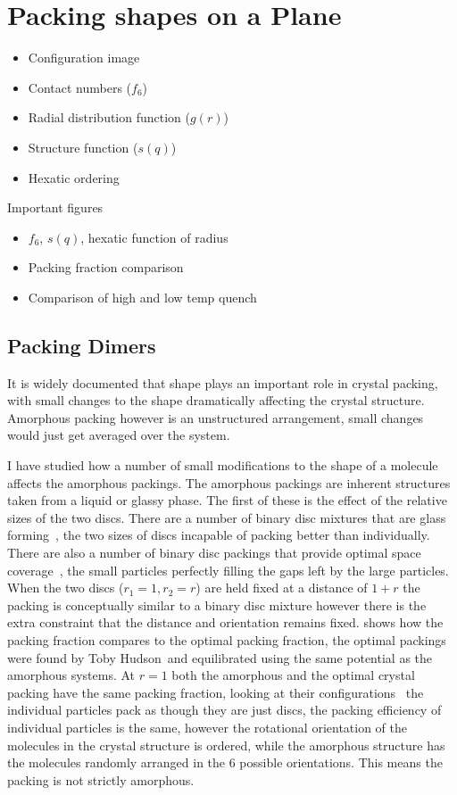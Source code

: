 \chapter{Packing shapes on a Plane}

\begin{itemize}
    \item Configuration image
    \item Contact numbers ($f_6$)
    \item Radial distribution function ($g(r)$)
    \item Structure function ($s(q)$)
    \item Hexatic ordering 
\end{itemize}

Important figures
\begin{itemize}
    \item $f_6$, $s(q)$, hexatic function of radius
    \item Packing fraction comparison
    \item Comparison of high and low temp quench
\end{itemize}

\section{Packing Dimers}

It is widely documented that shape plays an important role in crystal packing\tocite, with small changes to the shape dramatically affecting the crystal structure. Amorphous packing however is an unstructured arrangement, small changes would just get averaged over the system.

I have studied how a number of small modifications to the shape of a molecule affects the amorphous packings. The amorphous packings are inherent structures taken from a liquid or glassy phase. The first of these is the effect of the relative sizes of the two discs. There are a number of binary disc mixtures that are glass forming~\tocite, the two sizes of discs incapable of packing better than individually. There are also a number of binary disc packings that provide optimal space coverage~\tocite, the small particles perfectly filling the gaps left by the large particles. When the two discs ($r_1 = 1, r_2 = r$) are held fixed at a distance of $1+r$ the packing is conceptually similar to a binary disc mixture however there is the extra constraint that the distance and orientation remains fixed.  shows how the packing fraction compares to the optimal packing fraction, the optimal packings were found by Toby Hudson~\tocite and equilibrated using the same potential as the amorphous systems\toref. At $r = 1$ both the amorphous and the optimal crystal packing have the same packing fraction, looking at their configurations~ the individual particles pack as though they are just discs, the packing efficiency of individual particles is the same, however the rotational orientation of the molecules in the crystal structure is ordered, while the amorphous structure has the molecules randomly arranged in the 6 possible orientations\tocheck. This means the packing is not strictly amorphous.

